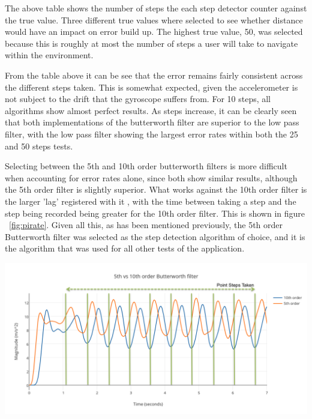 \documentclass[12pt,a4paper]{report}
\begin{document}
The above table shows the number of steps the each step detector counter against the true value. Three different true values where selected to see whether distance would have an impact on error build up. The highest true value, 50, was selected because this is roughly at most the number of steps a user will take to navigate within the environment. 

From the table above it can be see that the error remains fairly consistent across the different steps taken. This is somewhat expected, given the accelerometer is not subject to the drift that the gyroscope suffers from. For 10 steps, all algorithms show almost perfect results. As steps increase, it can be clearly seen that both implementations of the butterworth filter are superior to the low pass filter, with the low pass filter showing the largest error rates within both the 25 and 50 steps tests.

Selecting between the 5th and 10th order butterworth filters is more difficult when accounting for error rates alone, since both show similar results, although the 5th order filter is slightly superior. What works against the 10th order filter is the larger 'lag' registered with it  , with the time between taking a step and the step being recorded being greater for the 10th order filter. This is shown in figure ~\ref{fig:pirate}. Given all this, as has been mentioned previously, the 5th order Butterworth filter was selected as the step detection algorithm of choice, and it is the algorithm that was used for all other tests of the application.

\begin{center}
\includegraphics[scale=0.63]{images/pirateResults.png}
\label{fig:pirate}
\end{center}
\end{document}
